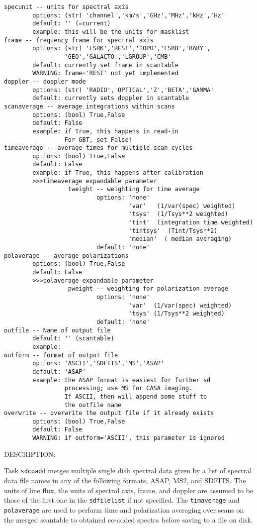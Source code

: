 \begin{verbatim}
specunit -- units for spectral axis
        options: (str) 'channel','km/s','GHz','MHz','kHz','Hz'
        default: '' (=current)
        example: this will be the units for masklist
frame -- frequency frame for spectral axis
        options: (str) 'LSRK','REST','TOPO','LSRD','BARY',
                 'GEO','GALACTO','LGROUP','CMB'
        default: currently set frame in scantable
        WARNING: frame='REST' not yet implemented
doppler -- doppler mode
        options: (str) 'RADIO','OPTICAL','Z','BETA','GAMMA'
        default: currently sets doppler in scantable
scanaverage -- average integrations within scans
        options: (bool) True,False
        default: False
        example: if True, this happens in read-in
                 For GBT, set False!
timeaverage -- average times for multiple scan cycles
        options: (bool) True,False
        default: False
        example: if True, this happens after calibration
        >>>timeaverage expandable parameter
                  tweight -- weighting for time average
                          options: 'none'
                                   'var'   (1/var(spec) weighted)
                                   'tsys'  (1/Tsys**2 weighted)
                                   'tint'  (integration time weighted)
                                   'tintsys'  (Tint/Tsys**2)
                                   'median'  ( median averaging)
                          default: 'none'
polaverage -- average polarizations
        options: (bool) True,False
        default: False
        >>>polaverage expandable parameter
                  pweight -- weighting for polarization average
                          options: 'none'
                                   'var'  (1/var(spec) weighted)
                                   'tsys' (1/Tsys**2 weighted)
                          default: 'none'
outfile -- Name of output file
        default: '' (scantable)
        example:
outform -- format of output file
        options: 'ASCII','SDFITS','MS','ASAP'
        default: 'ASAP'
        example: the ASAP format is easiest for further sd
                 processing; use MS for CASA imaging.
                 If ASCII, then will append some stuff to
                 the outfile name
overwrite -- overwrite the output file if it already exists
        options: (bool) True,False
        default: False
        WARNING: if outform='ASCII', this parameter is ignored
\end{verbatim}

          DESCRIPTION:

          Task {\tt sdcoadd} merges multiple single dish spectral data given by
          a list of spectral data file names in any of the following formats,
          ASAP, MS2, and SDFITS.
          The units of line flux, the units of spectral axis, frame, and doppler
          are assumed to be those of the first one in the {\tt sdfilelist} if not
          specified.
          The {\tt timaverage} and {\tt polaverage} are used to perform time
          and polarization averaging over scans on the merged scantable to 
          obtained co-added spectra before saving to a file on disk.


